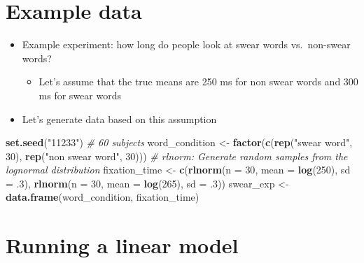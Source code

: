 \documentclass[]{article}
\newenvironment{Shaded}{}{}
\newcommand{\KeywordTok}[1]{\textcolor[rgb]{0.00,0.44,0.13}{\textbf{{#1}}}}
\newcommand{\DataTypeTok}[1]{\textcolor[rgb]{0.56,0.13,0.00}{{#1}}}
\newcommand{\DecValTok}[1]{\textcolor[rgb]{0.25,0.63,0.44}{{#1}}}
\newcommand{\StringTok}[1]{\textcolor[rgb]{0.25,0.44,0.63}{{#1}}}
\newcommand{\CommentTok}[1]{\textcolor[rgb]{0.38,0.63,0.69}{\textit{{#1}}}}
\newcommand{\NormalTok}[1]{{#1}}
\begin{document}
\section{Example data}\label{example-data}

\begin{itemize}
\itemsep1pt\parskip0pt
\item
  Example experiment: how long do people look at swear words
  vs.~non-swear words?

  \begin{itemize}
  \itemsep1pt\parskip0pt
  \item
    Let's assume that the true means are 250 ms for non swear words and
    300 ms for swear words
  \end{itemize}
\item
  Let's generate data based on this assumption
\end{itemize}

\begin{Shaded}
\begin{Highlighting}[]
\KeywordTok{set.seed}\NormalTok{(}\StringTok{"11233"}\NormalTok{)}
\CommentTok{# 60 subjects}
\NormalTok{word_condition <-}\StringTok{ }\KeywordTok{factor}\NormalTok{(}\KeywordTok{c}\NormalTok{(}\KeywordTok{rep}\NormalTok{(}\StringTok{"swear word"}\NormalTok{, }\DecValTok{30}\NormalTok{), }\KeywordTok{rep}\NormalTok{(}\StringTok{"non swear word"}\NormalTok{, }\DecValTok{30}\NormalTok{)))}
\CommentTok{# rlnorm: Generate random samples from the lognormal distribution}
\NormalTok{fixation_time <-}\StringTok{ }\KeywordTok{c}\NormalTok{(}\KeywordTok{rlnorm}\NormalTok{(}\DataTypeTok{n =} \DecValTok{30}\NormalTok{, }\DataTypeTok{mean =} \KeywordTok{log}\NormalTok{(}\DecValTok{250}\NormalTok{), }\DataTypeTok{sd =} \NormalTok{.}\DecValTok{3}\NormalTok{), }\KeywordTok{rlnorm}\NormalTok{(}\DataTypeTok{n =} \DecValTok{30}\NormalTok{, }\DataTypeTok{mean =} \KeywordTok{log}\NormalTok{(}\DecValTok{265}\NormalTok{), }\DataTypeTok{sd =} \NormalTok{.}\DecValTok{3}\NormalTok{))}
\NormalTok{swear_exp <-}\StringTok{ }\KeywordTok{data.frame}\NormalTok{(word_condition, fixation_time)}
\end{Highlighting}
\end{Shaded}

\section{Running a linear model}\label{running-a-linear-model}
\end{document}
